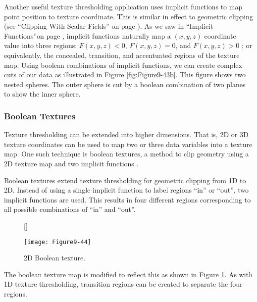 Another useful texture thresholding application uses implicit functions to map point position to texture coordinate. This is similar in effect to geometric clipping (see ``Clipping With Scalar Fields'' on page \pageref{subsec:clipping_with_scalar_fields}). As we saw in ``Implicit Functions''on page \pageref{subsec:implicit_functions}, implicit functions naturally map a $(x, y, z)$ coordinate value into three regions: $F(x, y, z) < 0$, $F(x, y, z) = 0$, and $F(x, y, z) > 0$ ; or equivalently, the concealed, transition, and accentuated regions of the texture map. Using boolean combinations of implicit functions, we can create complex cuts of our data as illustrated in Figure \ref{fig:Figure9-43b}. This figure shows two nested spheres. The outer sphere is cut by a boolean combination of two planes to show the inner sphere.

\subsubsection{Boolean Textures}

Texture thresholding can be extended into higher dimensions. That is, 2D or 3D texture coordinates can be used to map two or three data variables into a texture map. One such technique is boolean textures, a method to clip geometry using a 2D texture map and two implicit functions \cite{Lorensen93}.

Boolean textures extend texture thresholding for geometric clipping from 1D to 2D. Instead of using a single implicit function to label regions ``in'' or ``out'', two implicit functions are used. This results in four different regions corresponding to all possible combinations of ``in'' and ``out''.

\begin{figure}[!htb]
	[\FBwidth]
	{\caption{2D Boolean texture.}\label{fig:Figure9-44}}
	{\texttt{[image: Figure9-44]}}
\end{figure}

The boolean texture map is modified to reflect this as shown in Figure  \ref{fig:Figure9-44}. As with 1D texture thresholding, transition regions can be created to separate the four regions.

